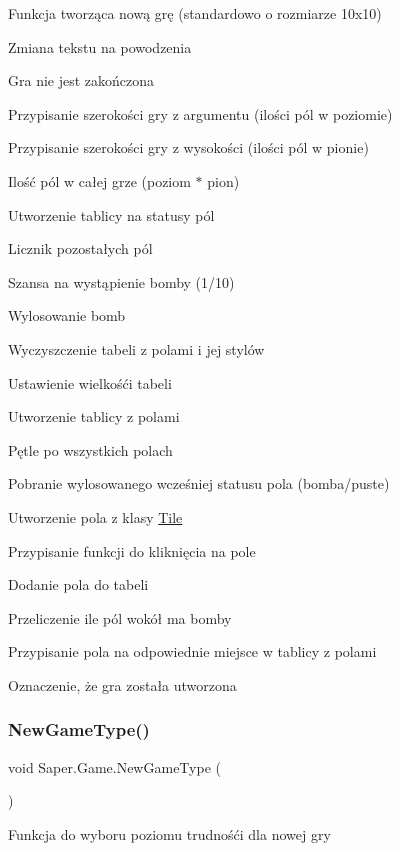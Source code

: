 Funkcja tworząca nową grę (standardowo o rozmiarze 10x10)

Zmiana tekstu na powodzenia

Gra nie jest zakończona

Przypisanie szerokości gry z argumentu (ilości pól w poziomie)

Przypisanie szerokości gry z wysokości (ilości pól w pionie)

Ilość pól w całej grze (poziom $\ast$ pion)

Utworzenie tablicy na statusy pól

Licznik pozostałych pól

Szansa na wystąpienie bomby (1/10)

Wylosowanie bomb

Wyczyszczenie tabeli z polami i jej stylów

Ustawienie wielkośći tabeli

Utworzenie tablicy z polami

Pętle po wszystkich polach

Pobranie wylosowanego wcześniej statusu pola (bomba/puste)

Utworzenie pola z klasy \mbox{\hyperlink{class_saper_1_1_tile}{Tile}}

Przypisanie funkcji do kliknięcia na pole

Dodanie pola do tabeli

Przeliczenie ile pól wokół ma bomby

Przypisanie pola na odpowiednie miejsce w tablicy z polami

Oznaczenie, że gra została utworzona \mbox{\label{class_saper_1_1_game_a1f14c9d69d6267494ca48f146c9e34c7}} 
\subsubsection{\texorpdfstring{NewGameType()}{NewGameType()}}
{\footnotesize\ttfamily void Saper.\+Game.\+New\+Game\+Type (\begin{DoxyParamCaption}{ }\end{DoxyParamCaption})}

Funkcja do wyboru poziomu trudnośći dla nowej gry \mbox{\label{class_saper_1_1_game_aa62b5814c25458101aaf843271dcff83}} 
